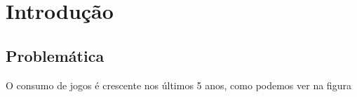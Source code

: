 
\chapter{Introdução}

\section{Problemática}
O consumo de jogos é crescente nos últimos 5 anos, como podemos ver na figura

